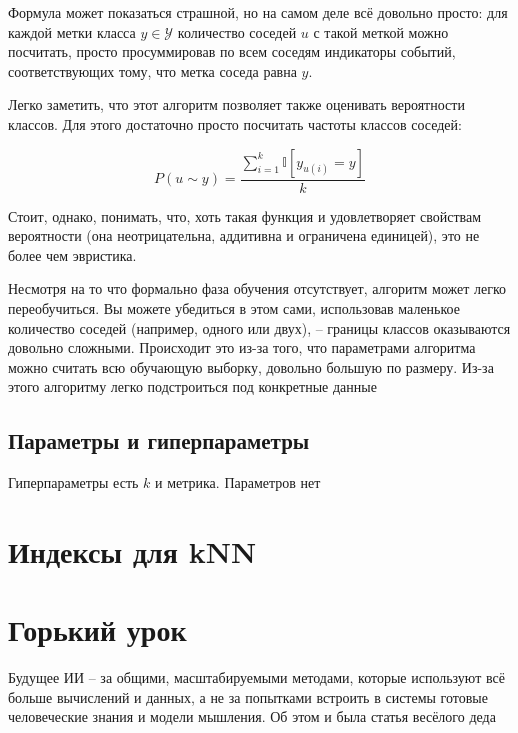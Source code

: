 \documentclass[a4paper, 14pt]{article}
\begin{document}
    Формула может показаться страшной, но на самом деле всё довольно просто: для каждой метки класса $y \in \mathcal{Y}$
    количество соседей $u$ с такой меткой можно посчитать, просто просуммировав по всем соседям индикаторы событий,
    соответствующих тому, что метка соседа равна $y$.
    
    Легко заметить, что этот алгоритм позволяет также оценивать вероятности классов.
    Для этого достаточно просто посчитать частоты классов соседей:
    
    \[ P(u \sim y) = \frac{\sum_{i=1}^k \mathbb{I}[y_{u(i)} = y]}{k} \]
    
    Стоит, однако, понимать, что, хоть такая функция и удовлетворяет свойствам вероятности (она неотрицательна,
    аддитивна и ограничена единицей), это не более чем эвристика.
    
    Несмотря на то что формально фаза обучения отсутствует, алгоритм может легко переобучиться.
    Вы можете убедиться в этом сами, использовав маленькое количество соседей (например, одного или двух), -- границы
    классов оказываются довольно сложными.
    Происходит это из-за того, что параметрами алгоритма можно считать всю обучающую выборку, довольно большую по
    размеру.
    Из-за этого алгоритму легко подстроиться под конкретные данные
    
    \subsection{Параметры и гиперпараметры}
    
    Гиперпараметры есть $k$ и метрика.
    Параметров нет
    
    \section{Индексы для kNN}
    
    
    \section{Горький урок}
    
    Будущее ИИ -- за общими, масштабируемыми методами, которые используют всё больше вычислений и данных, а не за
    попытками встроить в системы готовые человеческие знания и модели мышления.
    Об этом и была статья весёлого деда
    
\end{document}
